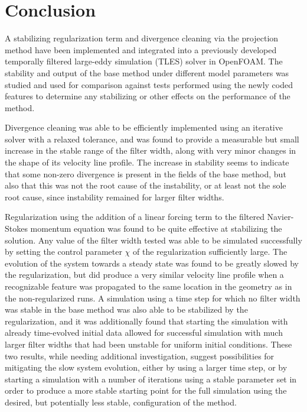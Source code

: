 \chapter{Conclusion}


A stabilizing regularization term and divergence cleaning via the projection method have been implemented and integrated into a previously developed temporally filtered large-eddy simulation (TLES) solver in OpenFOAM. The stability and output of the base method under different model parameters was studied and used for comparison against tests performed using the newly coded features to determine any stabilizing or other effects on the performance of the method.

Divergence cleaning was able to be efficiently implemented using an iterative solver with a relaxed tolerance, and was found to provide a measurable but small increase in the stable range of the filter width, along with very minor changes in the shape of its velocity line profile. The increase in stability seems to indicate that some non-zero divergence is present in the fields of the base method, but also that this was not the root cause of the instability, or at least not the sole root cause, since instability remained for larger filter widths.

Regularization using the addition of a linear forcing term to the filtered Navier-Stokes momentum equation was found to be quite effective at stabilizing the solution. Any value of the filter width tested was able to be simulated successfully by setting the control parameter $\chi$ of the regularization sufficiently large. The evolution of the system towards a steady state was found to be greatly slowed by the regularization, but did produce a very similar velocity line profile when a recognizable feature was propagated to the same location in the geometry as in the non-regularized runs. A simulation using a time step for which no filter width was stable in the base method was also able to be stabilized by the regularization, and it was additionally found that starting the simulation with already time-evolved initial data allowed for successful simulation with much larger filter widths that had been unstable for uniform initial conditions. These two results, while needing additional investigation, suggest possibilities for mitigating the slow system evolution, either by using a larger time step, or by starting a simulation with a number of iterations using a stable parameter set in order to produce a more stable starting point for the full simulation using the desired, but potentially less stable, configuration of the method.
